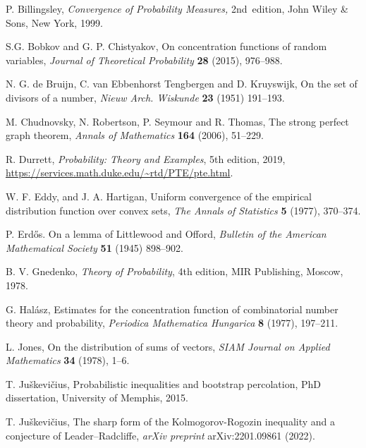 \documentclass{article}
\begin{document}
\begin{thebibliography}{21}







 P. Billingsley, {\em Convergence of Probability Measures,} 2nd~edition, John Wiley \& Sons, New York, 1999.

 S.G. Bobkov and G. P. Chistyakov, On concentration functions of random variables, \emph{Journal of Theoretical Probability} \textbf{28} (2015), 976--988. 

 N. G. de Bruijn, C. van Ebbenhorst Tengbergen and D. Kruyswijk, On the set of divisors of a number, \emph{Nieuw Arch. Wiskunde} \textbf{23} (1951) 191--193.



 M. Chudnovsky, N. Robertson, P. Seymour and R. Thomas, The strong perfect graph theorem, \emph{Annals of Mathematics} \textbf{164} (2006), 51--229. 



 R. Durrett, \emph{Probability: Theory and Examples}, 5th edition, 2019, \url{https://services.math.duke.edu/~rtd/PTE/pte.html}.

 W. F. Eddy, and J. A. Hartigan, Uniform convergence of the empirical distribution function over convex sets, \emph{The Annals of Statistics} \textbf{5} (1977), 370--374.

 P. Erd\H{o}s. On a lemma of Littlewood and Offord, \emph{Bulletin of the American Mathematical Society} \textbf{51} (1945) 898--902.

 B. V. Gnedenko, \emph{Theory of Probability}, 4th edition, MIR Publishing, Moscow, 1978.

 G. Hal{\'a}sz, Estimates for the concentration function of combinatorial number
  theory and probability, \emph{Periodica Mathematica Hungarica} \textbf{8} (1977), 197--211.

 L. Jones, On the distribution of sums of vectors, \emph{SIAM Journal on Applied Mathematics} \textbf{34} (1978), 1--6.

 T. Juškevičius, Probabilistic inequalities and bootstrap percolation, PhD dissertation, University of Memphis, 2015.

 T. Juškevičius, The sharp form of the Kolmogorov-Rogozin inequality and a conjecture of Leader--Radcliffe, \emph{arXiv preprint} arXiv:2201.09861 (2022).



\end{thebibliography}
\end{document}
